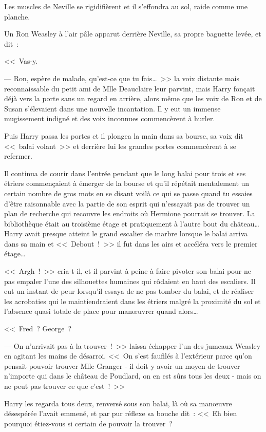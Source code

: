 Les muscles de Neville se rigidifièrent et il s'effondra au sol, raide comme une planche.

Un Ron Weasley à l'air pâle apparut derrière Neville, sa propre baguette levée, et dit~:

<<~Vas-y.

--- Ron, espère de malade, qu'est-ce que tu fais…~>> la voix distante mais reconnaissable du petit ami de Mlle Deauclaire leur parvint, mais Harry fonçait déjà vers la porte sans un regard en arrière, alors même que les voix de Ron et de Susan s'élevaient dans une nouvelle incantation. Il y eut un immense mugissement indigné et des voix inconnues commencèrent à hurler.

Puis Harry passa les portes et il plongea la main dans sa bourse, sa voix dit <<~balai volant~>> et derrière lui les grandes portes commencèrent à se refermer.

Il continua de courir dans l'entrée pendant que le long balai pour trois et ses étriers commençaient à émerger de la bourse et qu'il répétait mentalement un certain nombre de gros mots en se disant voilà ce qui se passe quand tu essaies d'être raisonnable avec la partie de son esprit qui n'essayait pas de trouver un plan de recherche qui recouvre les endroits où Hermione pourrait se trouver. La bibliothèque était au troisième étage et pratiquement à l'autre bout du château… Harry avait presque atteint le grand escalier de marbre lorsque le balai arriva dans sa main et <<~Debout~!~>> il fut dans les airs et accéléra vers le premier étage…

<<~Argh~!~>> cria-t-il, et il parvint à peine à faire pivoter son balai pour ne pas empaler l'une des silhouettes humaines qui rôdaient en haut des escaliers. Il eut un instant de peur lorsqu'il essaya de ne pas tomber du balai, et de réaliser les acrobaties qui le maintiendraient dans les étriers malgré la proximité du sol et l'absence quasi totale de place pour manœuvrer quand alors…

<<~Fred~? George~?

--- On n'arrivait pas à la trouver~!~>> laissa échapper l'un des jumeaux Weasley en agitant les mains de désarroi. <<~On s'est faufilés à l'extérieur parce qu'on pensait pouvoir trouver Mlle Granger - il doit y avoir un moyen de trouver n'importe qui dans le château de Poudlard, on en est sûrs tous les deux - mais on ne peut pas trouver ce que c'est~!~>>

Harry les regarda tous deux, renversé sous son balai, là où sa manœuvre désespérée l'avait emmené, et par pur réflexe sa bouche dit~: <<~Eh bien pourquoi étiez-vous si certain de pouvoir la trouver~?


